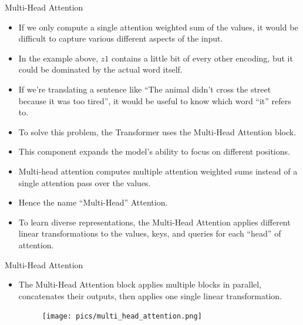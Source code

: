 \documentclass[handout]{beamer}
\begin{document}
\begin{frame}{Multi-Head Attention}
\begin{scriptsize}
\begin{itemize}

\item If we only compute a single attention weighted sum of the values, it would be difficult to capture various different aspects of the input.
\item In the example above, $z1$ contains a little bit of every other encoding, but it could be dominated by the actual word itself.
\item If we’re translating a sentence like ``The animal didn’t cross the street because it was too tired'', it would be useful to know which word ``it'' refers to.

\item To solve this problem, the Transformer uses the Multi-Head Attention block.
\item This component expands the model's ability to focus on different positions.
\item Multi-head attention computes multiple attention weighted sums instead of a single attention pass over the values.
\item Hence the name ``Multi-Head'' Attention.
\item To learn diverse representations, the Multi-Head Attention applies different linear transformations to the values, keys, and queries for each ``head'' of attention.
 
 
\end{itemize}

\end{scriptsize}

\end{frame}



\begin{frame}{Multi-Head Attention}
\begin{scriptsize}
\begin{itemize}
 \item The Multi-Head Attention block applies multiple blocks in parallel, concatenates their outputs, then applies one single linear transformation.
 
 
     \begin{figure}[h]
        	\texttt{[image: pics/multi\_head\_attention.png]}
        \end{figure}  
 

\end{itemize}

\end{scriptsize}

\end{frame}
\end{document}
